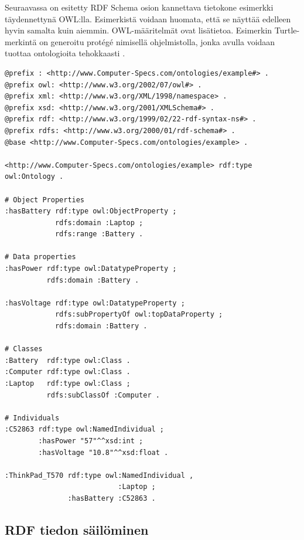 \documentclass[finnish, 12pt, a4paper, elec, utf8, pdfa, online]{aaltothesis}
\begin{document}

Seuraavassa on esitetty RDF Schema osion kannettava tietokone esimerkki täydennettynä OWL:lla. Esimerkistä voidaan huomata, että se näyttää edelleen hyvin samalta kuin aiemmin. OWL-määritelmät ovat lisätietoa. Esimerkin Turtle-merkintä on generoitu protégé nimisellä ohjelmistolla, jonka avulla voidaan tuottaa ontologioita tehokkaasti \cite{Protege}.

\vskip 0.75cm
\begin{lstlisting}[style=codeblock]
@prefix : <http://www.Computer-Specs.com/ontologies/example#> .
@prefix owl: <http://www.w3.org/2002/07/owl#> .
@prefix xml: <http://www.w3.org/XML/1998/namespace> .
@prefix xsd: <http://www.w3.org/2001/XMLSchema#> .
@prefix rdf: <http://www.w3.org/1999/02/22-rdf-syntax-ns#> .
@prefix rdfs: <http://www.w3.org/2000/01/rdf-schema#> .
@base <http://www.Computer-Specs.com/ontologies/example> .

<http://www.Computer-Specs.com/ontologies/example> rdf:type owl:Ontology .

# Object Properties
:hasBattery rdf:type owl:ObjectProperty ;
            rdfs:domain :Laptop ;
            rdfs:range :Battery .

# Data properties
:hasPower rdf:type owl:DatatypeProperty ;
          rdfs:domain :Battery .

:hasVoltage rdf:type owl:DatatypeProperty ;
            rdfs:subPropertyOf owl:topDataProperty ;
            rdfs:domain :Battery .

# Classes
:Battery  rdf:type owl:Class .
:Computer rdf:type owl:Class .
:Laptop   rdf:type owl:Class ;
          rdfs:subClassOf :Computer .

# Individuals
:C52863 rdf:type owl:NamedIndividual ;
        :hasPower "57"^^xsd:int ;
        :hasVoltage "10.8"^^xsd:float .

:ThinkPad_T570 rdf:type owl:NamedIndividual ,
                           :Laptop ;
               :hasBattery :C52863 .

\end{lstlisting}
\vskip 0.75cm


\subsection{RDF tiedon säilöminen}
\end{document}

